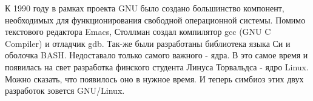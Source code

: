 \par К 1990 году в рамках проекта GNU было создано большинство компонент, необходимых для функционирования свободной операционной системы. Помимо текстового редактора Emacs, Столлман создал компилятор gcc (GNU C Compiler) и отладчик gdb. Так-же были разработаны библиотека языка Си и оболочка BASH. Недоставало только самого важного - ядра. В это самое время и появилась на свет разработка финского студента Линуса Торвальдса - ядро Linux. Можно сказать, что появилось оно в нужное время. И теперь симбиоз этих двух разработок зовется GNU/Linux.
